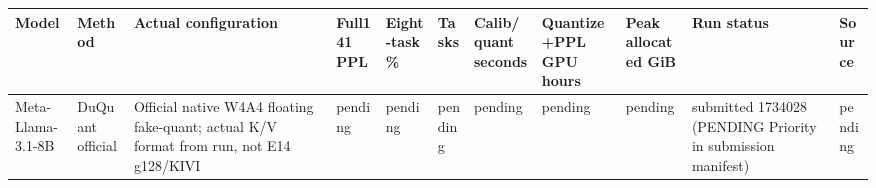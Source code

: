 \begin{tabular}{lllllllllll}
\toprule
Model & Method & Actual configuration & Full141 PPL & Eight-task \% & Tasks & Calib/quant seconds & Quantize+PPL GPU hours & Peak allocated GiB & Run status & Source \\
\midrule
Meta-Llama-3.1-8B & DuQuant official & Official native W4A4 floating fake-quant; actual K/V format from run, not E14 g128/KIVI & pending & pending & pending & pending & pending & pending & submitted 1734028 (PENDING Priority in submission manifest) & pending \\
\bottomrule
\end{tabular}
